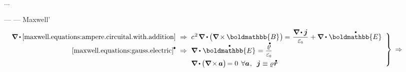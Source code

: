 ...


\:--- \href{https://en.wikipedia.org/wiki/Continuity_equation}{}  \:---   Maxwell’

\nopagebreak\vspace{.2em}\begin{equation*}
\left.\begin{array}{r@{\hspace{.6em}}c@{\hspace{.6em}}l}
\boldnabla \hspace{-0.1ex} \dotp \hspace{-0.1ex} \eqref{maxwell.equations:ampere.circuital.with.addition}
& \Rightarrow &
c^{\hspace{.16ex}2} \hspace{.22ex} \boldnabla \dotp \hspace{-0.1ex} \bigl( \boldnabla \hspace{-0.15ex} \times \hspace{-0.1ex} \boldmathbb{B} \hspace{.1ex} \bigr) \hspace{-0.1ex}
= \hspace{.1ex} \smash{\displaystyle \frac{\boldnabla \hspace{-0.15ex} \dotp \currentdensity}{\raisemath{.16em}{\vacuumpermittivity}}} \hspace{.1ex} + \boldnabla \dotp \hspace{.1ex} \mathdotabove{\boldmathbb{E}}
\\[.5em]
%
\eqref{maxwell.equations:gauss.electric}^{\hspace{-0.05ex}\tikz[baseline=-0.4ex]\draw[black, fill=black] (0,0) circle (.28ex);}
& \Rightarrow &
\boldnabla \dotp \hspace{.1ex} \mathdotabove{\boldmathbb{E}} \hspace{.1ex} = \smash{\displaystyle \frac{\mathdotabove{\chargedensity}}{\raisemath{.16em}{\vacuumpermittivity}}}
\\[.64em]
%
& &
\boldnabla \hspace{-0.1ex} \dotp \hspace{-0.1ex} \bigl( \boldnabla \hspace{-0.2ex} \times \hspace{-0.16ex} \bm{a} \bigr) \hspace{-0.3ex} = 0 \:\:\forall \bm{a}
\hspace{.1ex} , \hspace{.55em}
\currentdensity \equiv \chargedensity \hspace{.1ex} \mathdotabove{\locationvector}
\end{array}\hspace{.1ex}\right\rbrace
\hspace{.5ex}\Rightarrow\hspace*{4em}
\end{equation*}
